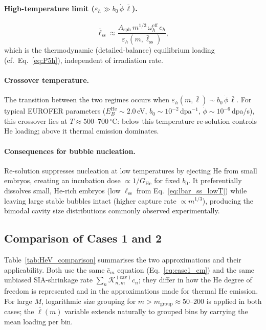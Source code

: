 \paragraph{High-temperature limit
($\varepsilon_h \gg b_0\,\dot{\phi}\,\bar{\ell}$).}
\begin{equation}\label{eq:lbar_ss_highT}
    \bar{\ell}_{\mathrm{ss}}
    \approx \frac{A_{\mathrm{sph}}\,m^{1/3}\,\omega_h^{\mathrm{eff}}\,c_h}
                 {\varepsilon_h(m,\bar{\ell}_{\mathrm{ss}})},
\end{equation}
which is the thermodynamic (detailed-balance) equilibrium loading
(cf.\ Eq.~\ref{eq:P5h}), independent of irradiation rate.

\paragraph{Crossover temperature.}
The transition between the two regimes occurs when
$\varepsilon_h(m,\bar{\ell}) \sim b_0\,\dot{\phi}\,\bar{\ell}$. For
typical EUROFER parameters ($E_B^{\mathrm{He}} \sim 2.0$\,eV,
$b_0 \sim 10^{-2}$\,dpa$^{-1}$, $\dot{\phi} \sim 10^{-6}$\,dpa/s),
this crossover lies at $T \approx 500$--$700\,^\circ$C: below this
temperature re-solution controls He loading; above it thermal emission
dominates.

\paragraph{Consequences for bubble nucleation.}
Re-solution suppresses nucleation at low temperatures by ejecting He
from small embryos, creating an incubation dose $\propto 1/G_{\mathrm{He}}$
for fixed $b_0$. It preferentially dissolves small, He-rich embryos
(low $\ell_{\mathrm{ss}}$ from Eq.~\ref{eq:lbar_ss_lowT}) while leaving
large stable bubbles intact (higher capture rate $\propto m^{1/3}$),
producing the bimodal cavity size distributions commonly observed
experimentally.

\subsection{Comparison of Cases 1 and 2}
\label{sec:comparison}

Table~\ref{tab:HeV_comparison} summarises the two approximations and
their applicability. Both use the same $\bar{c}_m$ equation
(Eq.~\ref{eq:case1_cm}) and the same unbiased SIA-shrinkage rate
$\sum_n \mathcal{K}_{n,m}^{(\mathrm{cav})} c_n$; they differ in how
the He degree of freedom is represented and in the approximations made
for thermal He emission. For large $M$, logarithmic size grouping for
$m > m_{\mathrm{group}} \approx 50$--200 is applied in both cases; the
$\bar{\ell}(m)$ variable extends naturally to grouped bins by carrying
the mean loading per bin.

